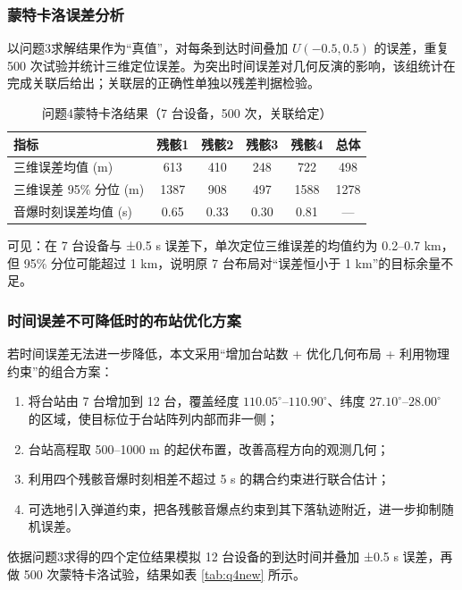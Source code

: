 \documentclass[12pt,a4paper]{article}
\begin{document}
\subsubsection{蒙特卡洛误差分析}

以问题3求解结果作为“真值”，对每条到达时间叠加 $U(-0.5,0.5)$ 的误差，重复 500 次试验并统计三维定位误差。为突出时间误差对几何反演的影响，该组统计在完成关联后给出；关联层的正确性单独以残差判据检验。

\begin{table}[H]
\centering
\caption{问题4蒙特卡洛结果（7 台设备，500 次，关联给定）}
\label{tab:q4mc}
\begin{tabular}{lccccc}
\toprule
指标 & 残骸1 & 残骸2 & 残骸3 & 残骸4 & 总体 \\
\midrule
三维误差均值 (m) & 613 & 410 & 248 & 722 & 498 \\
三维误差 95\% 分位 (m) & 1387 & 908 & 497 & 1588 & 1278 \\
音爆时刻误差均值 (s) & 0.65 & 0.33 & 0.30 & 0.81 & --- \\
\bottomrule
\end{tabular}
\end{table}

可见：在 7 台设备与 ±0.5 s 误差下，单次定位三维误差的均值约为 0.2--0.7 km，但 95\% 分位可能超过 1 km，说明原 7 台布局对“误差恒小于 1 km”的目标余量不足。

\subsubsection{时间误差不可降低时的布站优化方案}

若时间误差无法进一步降低，本文采用“增加台站数 + 优化几何布局 + 利用物理约束”的组合方案：

\begin{enumerate}[label=\arabic*.]
  \item 将台站由 7 台增加到 12 台，覆盖经度 $110.05^\circ$--$110.90^\circ$、纬度 $27.10^\circ$--$28.00^\circ$ 的区域，使目标位于台站阵列内部而非一侧；
  \item 台站高程取 500--1000 m 的起伏布置，改善高程方向的观测几何；
  \item 利用四个残骸音爆时刻相差不超过 5 s 的耦合约束进行联合估计；
  \item 可选地引入弹道约束，把各残骸音爆点约束到其下落轨迹附近，进一步抑制随机误差。
\end{enumerate}

依据问题3求得的四个定位结果模拟 12 台设备的到达时间并叠加 ±0.5 s 误差，再做 500 次蒙特卡洛试验，结果如表 \ref{tab:q4new} 所示。
\end{document}
